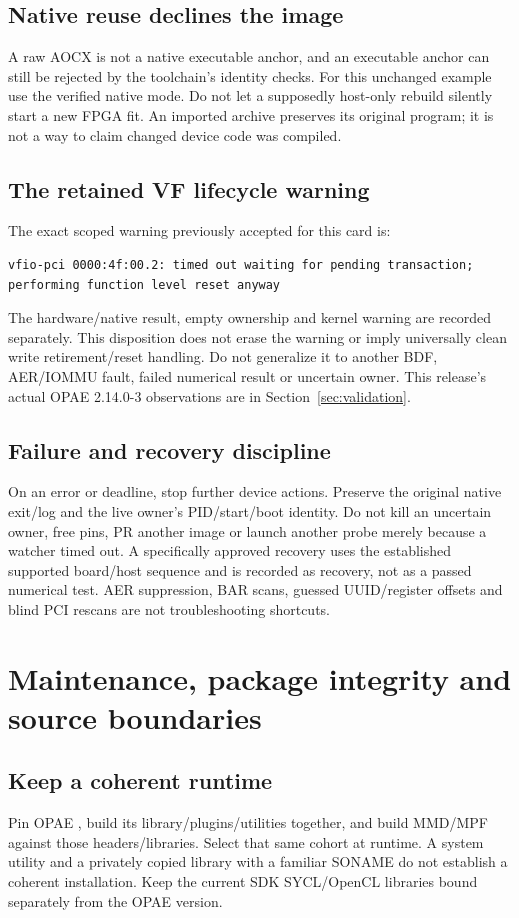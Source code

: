 \documentclass[11pt,letterpaper]{article}
\newcommand{\code}[1]{{\ttfamily\expandafter\seqsplit\expandafter{\detokenize{#1}}}}
\newcommand{\src}[1]{\cite{S#1}}
\newcommand{\chapterstart}[1]{\clearpage\section{#1}}
\begin{document}
\subsection{Native reuse declines the image}
A raw AOCX is not a native \code{-reuse-exe} executable anchor, and an executable
anchor can still be rejected by the toolchain's identity checks. For this
unchanged example use the verified native \code{AHLS_PREBUILT_ARCHIVE} mode.
Do not let a supposedly host-only rebuild silently start a new FPGA fit.
An imported archive preserves its original program; it is not a way to claim
changed device code was compiled.

\subsection{The retained VF lifecycle warning}
The exact scoped warning previously accepted for this card is:
\begin{lstlisting}
vfio-pci 0000:4f:00.2: timed out waiting for pending transaction;
performing function level reset anyway
\end{lstlisting}
The hardware/native result, empty ownership and kernel warning are recorded
separately. This disposition does not erase the warning or imply universally
clean write retirement/reset handling. Do not generalize it to another BDF,
AER/IOMMU fault, failed numerical result or uncertain owner. This release's
actual OPAE 2.14.0-3 observations are in Section~\ref{sec:validation}.

\subsection{Failure and recovery discipline}
On an error or deadline, stop further device actions. Preserve the original
native exit/log and the live owner's PID/start/boot identity. Do not kill an
uncertain owner, free pins, PR another image or launch another probe merely
because a watcher timed out. A specifically approved recovery uses the established
supported board/host sequence and is recorded as recovery, not as a passed
numerical test. AER suppression, BAR scans, guessed UUID/register offsets and
blind PCI rescans are not troubleshooting shortcuts.

\chapterstart{Maintenance, package integrity and source boundaries}
\subsection{Keep a coherent runtime}
Pin OPAE \code{2.14.0-3}, build its library/plugins/utilities together, and build
MMD/MPF against those headers/libraries. Select that same cohort at runtime.
A system utility and a privately copied library with a familiar SONAME do not
establish a coherent installation. Keep the current SDK SYCL/OpenCL libraries
bound separately from the OPAE version.\src{17}
\end{document}
